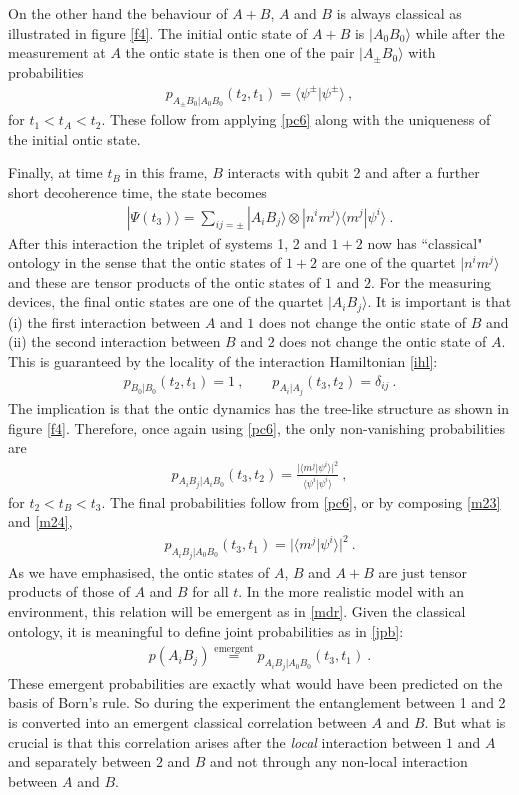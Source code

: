 \documentclass[%
preprint,
nofootinbib,
 amsmath,amssymb,
aps,
]{revtex4-1}
\def\bra#1{\langle #1|}
\def\ket#1{| #1\rangle}
\newcommand{\EQ}[1]{\begin{equation}\begin{split} #1
\end{split}\end{equation}}
\begin{document}
On the other hand the behaviour of $A+B$, $A$ and $B$ is always classical as illustrated in figure \ref{f4}. The initial ontic state of $A+B$ is $\ket{A_0B_0}$ while after the measurement at $A$ the ontic state is then one of the pair $\ket{A_\pm B_0}$ with probabilities
\EQ{
p_{A_\pm B_0|A_0B_0}(t_2,t_1)=\bra{\psi^\pm}\psi^\pm\rangle\ ,
\label{m23}
}
for $t_1<t_A<t_2$. These follow from applying \eqref{pc6} along with the uniqueness of the initial ontic state.

Finally, at time $t_B$ in this frame, $B$ interacts with qubit 2 and after a further short decoherence time, the state becomes
\EQ{
\ket{\Psi(t_3)}=\sum_{ij=\pm}\ket{A_iB_j}\otimes\ket{n^im^j}\bra{m^j}\psi^{i}\rangle\ .
}
After this interaction the 
triplet of systems 1, 2 and $1+2$ now has ``classical" ontology in the sense that the ontic states of $1+2$ are one of the quartet $\ket{n^im^j}$ and these are tensor products of the ontic states of $1$ and $2$. For the measuring devices, the final ontic states are one of the quartet $\ket{A_iB_j}$. It is important is that (i) the first interaction between $A$ and $1$ does not change the ontic state of $B$ and (ii) the second interaction between $B$ and $2$ does not change the ontic state of $A$. This is guaranteed by the locality of the interaction Hamiltonian \eqref{ihl}:
\EQ{
p_{B_0|B_0}(t_2,t_1)=1\ ,\qquad p_{A_i|A_j}(t_3,t_2)=\delta_{ij}\ .
}
The implication is that the ontic dynamics has the tree-like structure as shown in figure \ref{f4}. Therefore, once again using \eqref{pc6}, the only non-vanishing probabilities are
\EQ{
p_{A_iB_j|A_iB_0}(t_3,t_2)=\frac{\big|\bra{m^j}\psi^{i}\rangle\big|^2}{\bra{\psi^{i}}\psi^{i}\rangle}\ ,
\label{m24}
}
for $t_2<t_B<t_3$.
The final probabilities follow from \eqref{pc6}, or by composing \eqref{m23} and \eqref{m24},
\EQ{
p_{A_iB_j|A_0B_0}(t_3,t_1)=\big|\bra{m^j}\psi^{i}\rangle\big|^2\ .
}
As we have emphasised,
the ontic states of $A$, $B$ and $A+B$ are just tensor products of those of $A$ and $B$ for all $t$.
In the more realistic model with an environment, this relation will be emergent as in \eqref{mdr}.
Given the classical ontology, it is meaningful to define joint probabilities as in \eqref{jpb}:
\EQ{
p(A_i B_j)\overset{\text{emergent}}=p_{A_i B_j|A_0B_0}(t_3,t_1)\ .
\label{jqq}
}
These emergent probabilities are exactly what would have been predicted on the basis of Born's rule. So during the experiment the entanglement between 1 and 2 is converted into an emergent classical correlation between $A$ and $B$. But what is crucial is that this correlation arises after the {\it local\/} interaction between $1$ and $A$ and separately between $2$ and $B$ and not through any non-local interaction between $A$ and $B$.
\end{document}
